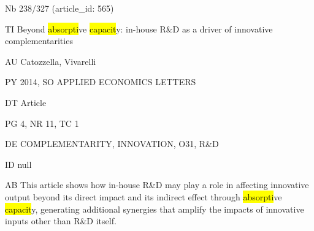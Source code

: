 \documentclass[a4paper]{article}
\begin{document}
\vspace*{-2cm}
Nb \tabto{0cm}238/327 (article\_id: 565)\par
TI \tabto{0cm}Beyond \hl{absorpti}ve \hl{capacit}y: in-house R\&D as a driver of innovative complementarities\par
AU \tabto{0cm}Catozzella, Vivarelli\par
PY \tabto{0cm}2014, SO APPLIED ECONOMICS LETTERS\par
DT \tabto{0cm}Article\par
PG \tabto{0cm}4, NR 11, TC 1\par
DE \tabto{0cm}COMPLEMENTARITY, INNOVATION, O31, R\&D\par
ID \tabto{0cm}null\par
AB \tabto{0cm}This article shows how in-house R\&D may play a role in affecting innovative output beyond its direct impact and its indirect effect through \hl{absorpti}ve \hl{capacit}y, generating additional synergies that amplify the impacts of innovative inputs other than R\&D itself.\par
\clearpage
\end{document}
